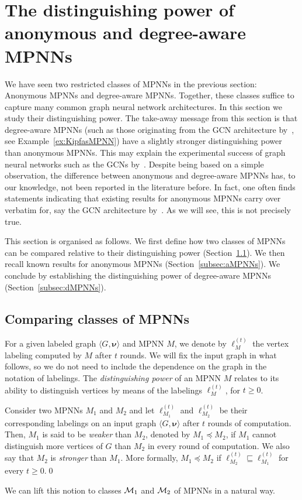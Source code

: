 \section{The distinguishing power of anonymous and degree-aware MPNNs}
We have seen two restricted classes of MPNNs in the previous section: Anonymous MPNNs and degree-aware MPNNs. Together, these classes suffice to capture many common graph neural network architectures. In this section we study their distinguishing power. The take-away message from this section is that degree-aware MPNNs (such as those originating from the GCN architecture by~\cite{kipf-loose}, see Example~\ref{ex:KipfasMPNN}) have a slightly stronger distinguishing power than anonymous MPNNs. This may explain the experimental success of graph neural networks such as the GCNs by~\cite{kipf-loose}. Despite being based on a simple observation, the difference between anonymous and degree-aware MPNNs has, to our knowledge, not been reported in the literature before. In fact, one often finds statements indicating that existing results for anonymous MPNNs \cite{xhlj19,grohewl} carry over verbatim for, say the GCN architecture
by~\cite{kipf-loose}. As we will see, this is not precisely true.

This section is organised as follows. We first define how two classes of MPNNs can be compared relative to  their distinguishing power (Section~\ref{subsec:compare}). We then recall known results for anonymous MPNNs (Section~\ref{subsec:aMPNNs}). We conclude by establishing the distinguishing power of degree-aware MPNNs (Section~\ref{subsec:dMPNNs}).

\subsection{Comparing classes of MPNNs}\label{subsec:compare}
For a given labeled graph $\langle G,\pmb{\nu}\rangle$ and MPNN $M$, we denote by 
$\pmb{\ell}_M^{(t)}$ the vertex labeling computed by $M$ after $t$ rounds. We will fix the input graph in what follows, so we do not need to include the dependence on the graph in the notation of labelings.
The \textit{distinguishing power} of an MPNN $M$ relates to its ability to distinguish vertices by means of the labelings $\pmb{\ell}_M^{(t)}$, for $t\geq 0$. 

\begin{definition}\label{def:mpnnweak}\normalfont
Consider two MPNNs $M_1$ and $M_2$ and let $\pmb{\ell}_{M_1}^{(t)}$ and $\pmb{\ell}_{M_2}^{(t)}$  be their corresponding labelings on an input graph $\langle G,\pmb{\nu}\rangle$ after $t$ rounds of computation. Then,
$M_1$ is said to be \textit{weaker} than $M_2$, denoted by $M_1\preceq M_2$, if $M_1$ cannot distinguish more vertices of $G$ than $M_2$ in every round of computation. We also say that $M_2$ is \textit{stronger} than $M_1$. More formally, $M_1\preceq M_2$ if $\pmb{\ell}_{M_2}^{(t)}\sqsubseteq
\pmb{\ell}_{M_1}^{(t)}$ for every $t\geq 0$.\qed
\end{definition}
We can lift this notion to classes  $\mathcal{M}_1$ and $\mathcal{M}_2$ of MPNNs in a natural way. 

